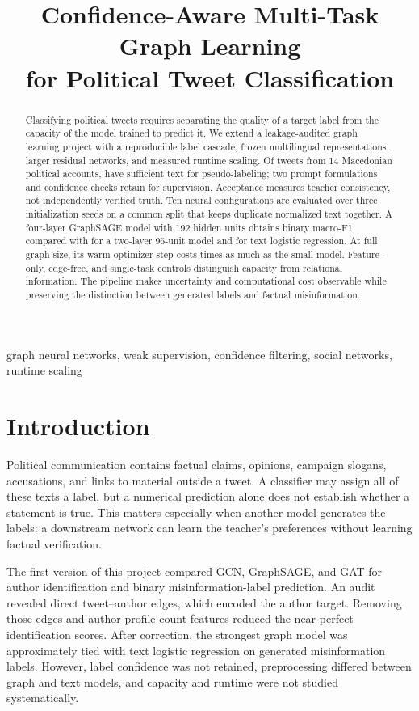 \documentclass[conference]{IEEEtran}
\title{Confidence-Aware Multi-Task Graph Learning\\for Political Tweet Classification}
\author{\IEEEauthorblockN{Viktor Najdovski}\IEEEauthorblockA{222097}}
\begin{document}
\maketitle
\begin{abstract}
Classifying political tweets requires separating the quality of a target label from the capacity of the model trained to predict it. We extend a leakage-audited graph learning project with a reproducible label cascade, frozen multilingual representations, larger residual networks, and measured runtime scaling. Of \NumTweets{} tweets from 14 Macedonian political accounts, \NumEligible{} have sufficient text for pseudo-labeling; two prompt formulations and confidence checks retain \NumAccepted{} for supervision. Acceptance measures teacher consistency, not independently verified truth. Ten neural configurations are evaluated over three initialization seeds on a common split that keeps duplicate normalized text together. A four-layer GraphSAGE model with 192 hidden units obtains \LargeFOne{} binary macro-F1, compared with \SmallFOne{} for a two-layer 96-unit model and \TextFOne{} for text logistic regression. At full graph size, its warm optimizer step costs \LargeTimeRatio{} times as much as the small model. Feature-only, edge-free, and single-task controls distinguish capacity from relational information. The pipeline makes uncertainty and computational cost observable while preserving the distinction between generated labels and factual misinformation.
\end{abstract}
\begin{IEEEkeywords}
graph neural networks, weak supervision, confidence filtering, social networks, runtime scaling
\end{IEEEkeywords}

\section{Introduction}
Political communication contains factual claims, opinions, campaign slogans, accusations, and links to material outside a tweet. A classifier may assign all of these texts a label, but a numerical prediction alone does not establish whether a statement is true. This matters especially when another model generates the labels: a downstream network can learn the teacher's preferences without learning factual verification.

The first version of this project compared GCN, GraphSAGE, and GAT for author identification and binary misinformation-label prediction. An audit revealed direct tweet--author edges, which encoded the author target. Removing those edges and author-profile-count features reduced the near-perfect identification scores. After correction, the strongest graph model was approximately tied with text logistic regression on generated misinformation labels. However, label confidence was not retained, preprocessing differed between graph and text models, and capacity and runtime were not studied systematically.
\end{document}
